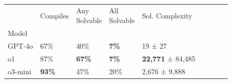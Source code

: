 \begin{tabular}{lllllllll}
\toprule
 & Compiles & \makecell{Any\\Solvable} & \makecell{All\\Solvable} & Sol. Complexity \\
Model &  &  &  &   \\
\midrule
GPT-4o & 67\% & 40\% & \textbf{7\%} & 19 ± 27 \\
o1 & 87\% & \textbf{67\%} & \textbf{7\%} & \textbf{22,771} ± 84,485 \\
o3-mini & \textbf{93\%} & 47\% & 20\% & 2,676 ± 9,888  \\
\bottomrule
\end{tabular}

